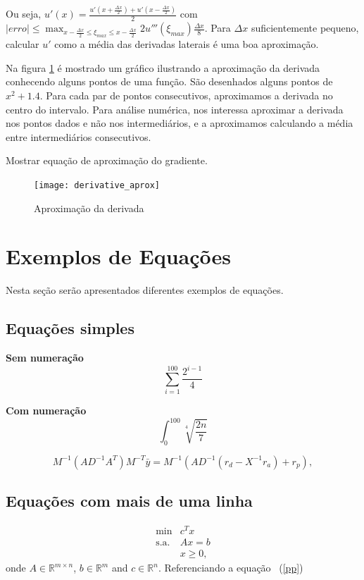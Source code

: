 \documentclass[12pt,fleqn]{article}
\newcommand{\Rn}{{\ensuremath{\mathbb{R}}}^{n}}
\newcommand{\Rm}{{\ensuremath{\mathbb{R}}}^{m}}
\newcommand{\Rmn}{{\ensuremath{\mathbb{R}}}^{{m}\times{n}}}
\begin{document}
Ou seja, $u'(x) = \frac{u'(x + \frac{\Delta x}{2}) + u'(x - \frac{\Delta x}{2})}{2}$ com $|erro| \leq \max_{x - \frac{\Delta x}{2} \leq \xi_{max} \leq x - \frac{\Delta x}{2}} 2u'''(\xi_{max}) \frac{\Delta x}{8}$. Para $\Delta x$ suficientemente pequeno, calcular $u'$ como a média das derivadas laterais é uma boa aproximação.

Na figura \ref{fig:derivative_aprox} é mostrado um gráfico ilustrando a aproximação da derivada conhecendo alguns pontos de uma função. São desenhados alguns pontos de $x^2 + 1.4$. Para cada par de pontos consecutivos, aproximamos a derivada no centro do intervalo. Para análise numérica, nos interessa aproximar a derivada nos pontos dados e não nos intermediários, e a aproximamos calculando a média entre intermediários consecutivos.

Mostrar equação de aproximação do gradiente.

\begin{figure}[H]
	\centering
		\texttt{[image: derivative\_aprox]}
		\caption{Aproximação da derivada}
		\label{fig:derivative_aprox}
\end{figure}

\section{Exemplos de Equações}
Nesta seção serão apresentados diferentes exemplos de equações.

\subsection{Equações simples}

\textbf{Sem numeração}
\[\sum_{i=1}^{100}\frac{2^{i-1}}{4}\]

\textbf{Com numeração}
\begin{equation}
	\int_{0}^{100}\sqrt[4]{\frac{2n}{7}}
\end{equation}

\begin{equation}
M^{-1}(AD^{-1}A^T)M^{-T}\bar{y} = M^{-1}(AD^{-1}(r_d -X^{-1}r_a) + r_p),
\end{equation}


\subsection{Equações com mais de uma linha}
\begin{eqnarray}
\label{pp} %
\min & c^Tx \\ \nonumber
\mbox{s.a.} & Ax=b \\ \nonumber
            & x \geq 0, \nonumber
\end{eqnarray}
onde $A \in \Rmn$, $b \in \Rm$ and $c \in \Rn$.
Referenciando a equação ~(\ref{pp})
\end{document}

